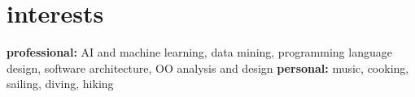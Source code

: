 \documentclass[]{friggeri-cv} %
\begin{document}







\section{interests}

\textbf{professional:} AI and machine learning, data mining, programming language design, software architecture, OO analysis and design \textbf{personal:} music, cooking, sailing, diving, hiking


\end{document}
